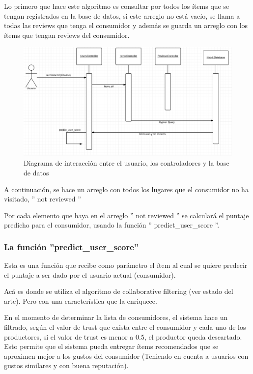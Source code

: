Lo primero que hace este algoritmo es consultar por todos los ítems que se tengan registrados en la base de datos, si este arreglo no está vacío, se llama a todas las reviews que tenga el consumidor y además se guarda un arreglo con los ítems que tengan reviews del consumidor. 

\begin{figure}[hbtp]
\centering
\includegraphics[scale=0.65]{images/recc_funct.png}
\caption{Diagrama de interacción entre el usuario, los controladores y la base de datos}
\end{figure}

A continuación, se hace un arreglo con todos los lugares que el consumidor no ha visitado,  '' not reviewed ''

Por cada elemento que haya en el arreglo '' not reviewed '' se calculará el puntaje predicho para el consumidor, usando la función '' predict\_user\_score ''.

\subsubsection{La función ''predict\_user\_score''}

Esta es una función que recibe como parámetro el ítem al cual se quiere predecir el puntaje a ser dado por el usuario actual (consumidor).

Acá es donde se utiliza el algoritmo de collaborative filtering (ver estado del arte). Pero con una característica que la enriquece. 

En el momento de determinar la lista de consumidores, el sistema hace un filtrado, según el valor de trust que exista entre el consumidor y cada uno de los productores, si el valor de trust es menor a 0.5, el productor queda descartado. Esto permite que el sistema pueda entregar ítems recomendados que se aproximen mejor a los gustos del consumidor (Teniendo en cuenta a usuarios con gustos similares y con buena reputación). 

